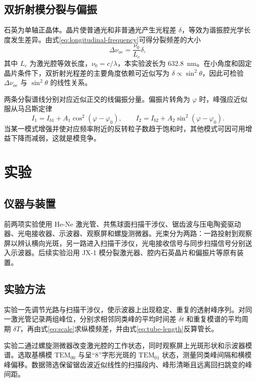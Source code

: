 \documentclass[UTF8,a4paper,10pt]{ctexart}
\begin{document}
\subsection{双折射模分裂与偏振}

石英为单轴正晶体。晶片使普通光和非普通光产生光程差 $\delta$，等效为谐振腔光学长度发生差异。由式\eqref{eq:longitudinal-frequency}可得分裂频差的大小
\begin{equation}
  \Delta\nu_{oe}=\frac{\nu_0}{L_c}\delta, \label{eq:splitting}
\end{equation}
其中 $L_c$ 为激光腔等效长度，$\nu_0=c/\lambda$，本实验波长为 \SI{632.8}{\nano\metre}。在小角度和固定晶片条件下，双折射光程差的主要角度依赖可近似写为 $\delta\propto\sin^2\theta$，因此可检验 $\Delta\nu_{oe}$ 与 $\sin^2\theta$ 的线性关系。

两条分裂谱线分别对应近似正交的线偏振分量\cite{zhang}。偏振片转角为 $\varphi$ 时，峰强应近似服从马吕斯定律
\begin{equation}
  I_1=I_{b1}+A_1\cos^2(\varphi-\varphi_0),\qquad
  I_2=I_{b2}+A_2\sin^2(\varphi-\varphi_0). \label{eq:malus}
\end{equation}
当某一模式增强并使对应频率附近的反转粒子数趋于饱和时，其他模式可因可用增益下降而减弱，这就是模竞争\cite{chen}。

\section{实验}

\subsection{仪器与装置}

前两项实验使用 He-Ne 激光管、共焦球面扫描干涉仪、锯齿波与压电陶瓷驱动器、光电接收器、示波器、观察屏和螺旋测微器。光束分为两路：一路投射到观察屏以辨认横向光斑，另一路进入扫描干涉仪，光电接收信号与同步扫描信号分别送入示波器。后续实验沿用 JX-1 模分裂激光器、腔内石英晶片和偏振片等原有装置。

\subsection{实验方法}

实验一先调节光路与扫描干涉仪，使示波器上出现稳定、重复的透射峰序列。对同一激光管记录两组峰位，分别求相邻同类峰的平均时间差 $\delta t$ 和重复模谱的平均周期 $\delta T$，再由式\eqref{eq:scale}求纵模频差，并由式\eqref{eq:tube-length}反算管长。

实验二通过螺旋测微器改变激光腔的工作状态，同时观察屏上光斑形状和示波器模谱。选取基横模 $\mathrm{TEM}_{00}$ 与呈“8”字形光斑的 $\mathrm{TEM}_{01}$ 状态，测量同类峰间隔和横模峰偏移。数据筛选保留锯齿波近似线性的扫描段内、峰形清晰且远离回扫跳变的峰间距。
\end{document}
